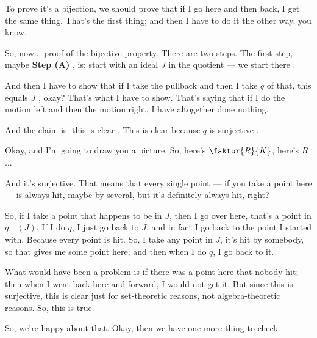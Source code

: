 \begin{proofWrapper}
\begin{speech}[00:28:35 - 00:30:18]
To prove it's a bijection, we should prove that if I go here and then back, I get the same thing. That's the first thing; and then I have to do it the other way, you know.

So, now...  proof of the bijective property. There are two steps. The first step, maybe \textbf{Step (A)} , is: start with an ideal $J$ in the quotient --- we start there .

And then I have to show that if I take the pullback and then I take $q$ of that, this equals $J$ , okay? That's what I have to show. That's saying that if I do the motion left and then the motion right, I have altogether done nothing.

And the claim is: this is clear . This is clear because $q$ is surjective .

Okay, and I'm going to draw you a picture. So, here's $\faktor{R}{K}$, here's $R$...
\end{speech}

\begin{speech}[00:30:18 - 00:31:26]
And it's surjective. That means that every single point --- if you take a point here --- is always hit, maybe by several, but it's definitely always hit, right?

So, if I take a point that happens to be in $J$, then I go over here, that's a point in $q^{-1}(J)$. If I do $q$, I just go back to $J$, and in fact I go back to the point I started with. Because every point is hit. So, I take any point in $J$, it's hit by somebody, so that gives me some point here; and then when I do $q$, I go back to it.

What would have been a problem is if there was a point here that nobody hit; then when I went back here and forward, I would not get it. But since this is surjective, this is clear just for set-theoretic reasons, not algebra-theoretic reasons. So, this is true. 

So, we're happy about that. Okay, then we have one more thing to check.
\end{speech}


\end{proofWrapper}
